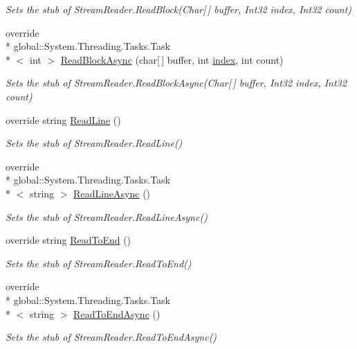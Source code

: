 \begin{DoxyCompactItemize}
\begin{DoxyCompactList}\small\item\em Sets the stub of Stream\-Reader.\-Read\-Block(\-Char\mbox{[}$\,$\mbox{]} buffer, Int32 index, Int32 count)\end{DoxyCompactList}\item 
override \\*
global\-::\-System.\-Threading.\-Tasks.\-Task\\*
$<$ int $>$ \hyperlink{class_system_1_1_i_o_1_1_fakes_1_1_stub_stream_reader_a95d68b19baccf12d29bd4a1833be7dab}{Read\-Block\-Async} (char\mbox{[}$\,$\mbox{]} buffer, int \hyperlink{jquery-1_810_82-vsdoc_8js_a75bb12d1f23302a9eea93a6d89d0193e}{index}, int count)
\begin{DoxyCompactList}\small\item\em Sets the stub of Stream\-Reader.\-Read\-Block\-Async(\-Char\mbox{[}$\,$\mbox{]} buffer, Int32 index, Int32 count)\end{DoxyCompactList}\item 
override string \hyperlink{class_system_1_1_i_o_1_1_fakes_1_1_stub_stream_reader_a189e1f181798fbede9cf22ebb1e6023f}{Read\-Line} ()
\begin{DoxyCompactList}\small\item\em Sets the stub of Stream\-Reader.\-Read\-Line()\end{DoxyCompactList}\item 
override \\*
global\-::\-System.\-Threading.\-Tasks.\-Task\\*
$<$ string $>$ \hyperlink{class_system_1_1_i_o_1_1_fakes_1_1_stub_stream_reader_a4e894aef78679256889b8ee4cb20f820}{Read\-Line\-Async} ()
\begin{DoxyCompactList}\small\item\em Sets the stub of Stream\-Reader.\-Read\-Line\-Async()\end{DoxyCompactList}\item 
override string \hyperlink{class_system_1_1_i_o_1_1_fakes_1_1_stub_stream_reader_a12781bb0520f4ccec0115c217ac39fd3}{Read\-To\-End} ()
\begin{DoxyCompactList}\small\item\em Sets the stub of Stream\-Reader.\-Read\-To\-End()\end{DoxyCompactList}\item 
override \\*
global\-::\-System.\-Threading.\-Tasks.\-Task\\*
$<$ string $>$ \hyperlink{class_system_1_1_i_o_1_1_fakes_1_1_stub_stream_reader_a549bd09236b75364f119027985456020}{Read\-To\-End\-Async} ()
\begin{DoxyCompactList}\small\item\em Sets the stub of Stream\-Reader.\-Read\-To\-End\-Async()\end{DoxyCompactList}\end{DoxyCompactItemize}
